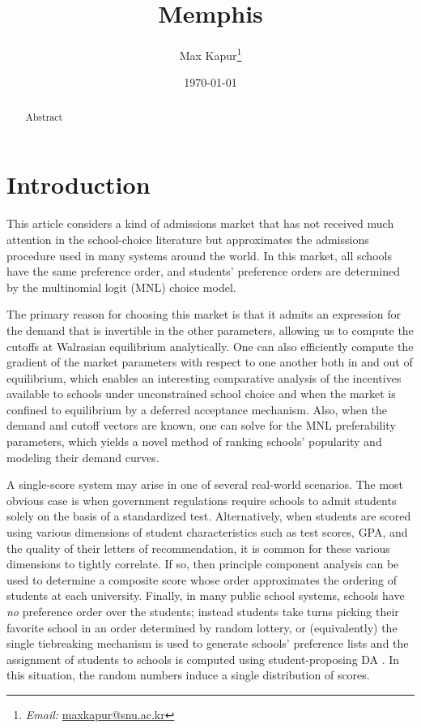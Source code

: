\documentclass[12pt]{article}
\numberwithin{equation}{subsection}
\theoremstyle{definition}
\begin{document}
\title{Memphis}
\date{\today}
\author{Max Kapur\footnote{\emph{Email:} \href{mailto:maxkapur@snu.ac.kr}{maxkapur@snu.ac.kr}}}



\maketitle

\begin{abstract}
Abstract
\end{abstract}

\pagebreak
\tableofcontents

\pagebreak
\section{Introduction}
This article considers a kind of admissions market that has not received much attention in the school-choice literature but approximates the admissions procedure used in many systems around the world. In this market, all schools have the same preference order, and students' preference orders are determined by the multinomial logit (MNL) choice model.

The primary reason for choosing this market is that it admits an expression for the demand that is invertible in the other parameters, allowing us to compute the cutoffs at Walrasian equilibrium analytically. One can also efficiently compute the gradient of the market parameters with respect to one another both in and out of equilibrium, which enables an interesting comparative analysis of the incentives available to schools under unconstrained school choice and when the market is confined to equilibrium by a deferred acceptance mechanism. Also, when the demand and cutoff vectors are known, one can solve for the MNL preferability parameters, which yields a novel method of ranking schools' popularity and modeling their demand curves. 

A single-score system may arise in one of several real-world scenarios. The most obvious case is when government regulations require schools to admit students solely on the basis of a standardized test. Alternatively, when students are scored using various dimensions of student characteristics such as test scores, GPA, and the quality of their letters of recommendation, it is common for these various dimensions to tightly correlate. If so, then principle component analysis can be used to determine a composite score whose order approximates the ordering of students at each university. Finally, in many public school systems, schools have \emph{no} preference order over the students; instead students take turns picking their favorite school in an order determined by random lottery, or (equivalently) the single tiebreaking mechanism is used to generate schools’ preference lists and the assignment of students to schools is computed using student-proposing DA \parencite[][]{whatmatters}. In this situation, the random numbers induce a single distribution of scores.
\end{document}
